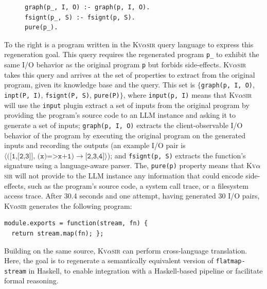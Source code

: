 \documentclass[nonacm,sigplan,review]{acmart}
\newcommand{\sys}{{\scshape Kv{$\alpha$}sir}\xspace}
\newcommand{\ttt}[1]{\texttt{#1}\xspace}
\begin{document}
\begin{figure}
\vspace{-10pt}
\hspace{-10pt}
\begin{verbatim}
graph(p_, I, O) :- graph(p, I, O).
fsignt(p_, S) :- fsignt(p, S).
pure(p_).
\end{verbatim}
\end{figure}
To the right is a program written in the \sys query language to express 
this regeneration goal.
This query requires the regenerated program \ttt{p\_} to exhibit the same I/O behavior as the original program \ttt{p}
but forbids side-effects.
\sys takes this query and arrives at the set of properties to extract from the
original program, given its knowledge base and the query.
This set is $\{$\ttt{graph(p, I, O)}, \ttt{inpt(P, I)}, \ttt{fsignt(P, S)}, \ttt{pure(P)}$\}$, where
\ttt{input(p, I)} means that \sys will use the \ttt{input} plugin extract a set of inputs from the original program
by providing the program's source code to an LLM instance and asking it to generate a set of inputs;
\ttt{graph(p, I, O)} extracts the client-observable I/O behavior of the program
by executing the original program on the generated inputs and recording the outputs
(an example I/O pair is $\langle\ttt{([1,[2,3]], (x)=>x+1)}\to\ttt{[2,3,4]}\rangle$);
and \ttt{fsignt(p, S)} extracts the function's signature using a language-aware parser.
The, \ttt{pure(p)} property means that \sys will not provide to the LLM 
instance any information that could encode side-effects, such as the
program's source code, a system call trace, or a filesystem access trace.
After 30.4 seconds and one attempt, having generated 30 I/O pairs, \sys generates the following program:
\begin{verbatim}
module.exports = function(stream, fn) {
  return stream.map(fn); };
\end{verbatim}

Building on the same source, \sys can perform cross-language
translation. 
Here, the goal is to regenerate a semantically equivalent version
of \ttt{flatmap-stream} in Haskell, to enable integration with a
Haskell-based pipeline or facilitate formal reasoning.
\end{document}
